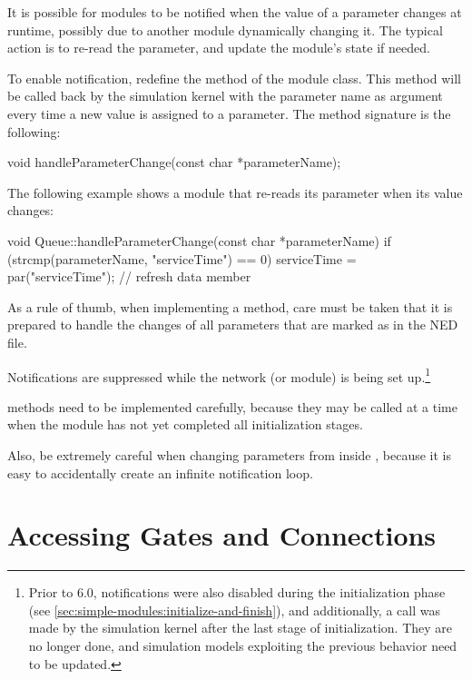 It is possible for modules to be notified when the value of a parameter changes
at runtime, possibly due to another module dynamically changing it. The typical
action is to re-read the parameter, and update the module's state if needed.

To enable notification, redefine the  method of
the module class. This method will be called back by the simulation kernel with
the parameter name as argument every time a new value is assigned to a parameter.
The method signature is the following:

\begin{cpp}
void handleParameterChange(const char *parameterName);
\end{cpp}

The following example shows a module that re-reads
its  parameter when its value changes:

\begin{cpp}
void Queue::handleParameterChange(const char *parameterName)
{
    if (strcmp(parameterName, "serviceTime") == 0)
        serviceTime = par("serviceTime"); // refresh data member
}
\end{cpp}

\begin{note}
  As a rule of thumb, when implementing a 
  method, care must be taken that it is prepared to handle the changes of all
  parameters that are marked as  in the NED file.
\end{note}

Notifications are suppressed while the network (or module) is being set
up.\footnote{ Prior to {\opp} 6.0, notifications were also disabled during the
initialization phase (see \ref{sec:simple-modules:initialize-and-finish}), and
additionally, a  call was made by the
simulation kernel after the last stage of initialization. They are no longer
done, and simulation models exploiting the previous behavior need to be
updated.}

 methods need to be implemented carefully,
because they may be called at a time when the module has not yet completed all
initialization stages.

Also, be extremely careful when changing parameters from inside
, because it is easy to accidentally
create an infinite notification loop.


\section{Accessing Gates and Connections}
\label{sec:simple-modules:gates}

